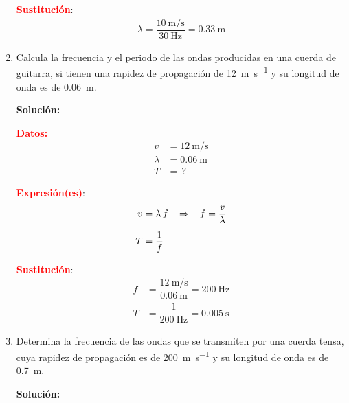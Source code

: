 \documentclass[14pt]{extarticle}
\newcommand{\textocolor}[2]{\textbf{\textcolor{#1}{#2}}}
\begin{document}
\begin{enumerate}
\begin{minipage}{0.5\linewidth}
\noindent
\textocolor{red}{Sustitución}:
\begin{align*}
\lambda = \dfrac{\SI{10}{\meter\per\second}}{\SI{30}{\hertz}} = \SI{0.33}{\meter}
\end{align*}
\end{minipage}
\item Calcula la frecuencia y el periodo de las ondas producidas en una cuerda de guitarra, si tienen una rapidez de propagación de \SI{12}{\meter\per\second} y su longitud de onda es de \SI{0.06}{\meter}.

\textbf{Solución:}

\begin{minipage}[t]{0.35\linewidth}
\noindent
\textocolor{red}{Datos:}
\begin{align*}
v &= \SI{12}{\meter\per\second} \\[0.5em]
\lambda &= \SI{0.06}{\meter} \\[0.5em]
T &= \, ?
\end{align*}
\end{minipage}
\hspace{1cm}
\begin{minipage}[t]{0.35\linewidth}
\noindent
\textocolor{red}{Expresión(es)}:
\begin{align*}
v &= \lambda \, f \hspace{0.3cm} \Rightarrow \hspace{0.3cm} f = \dfrac{v}{\lambda} \\[0.5em]
T &= \dfrac{1}{f}    
\end{align*}
\end{minipage}

\begin{minipage}{0.5\linewidth}
\noindent
\textocolor{red}{Sustitución}:
\begin{align*}
f &= \dfrac{\SI{12}{\meter\per\second}}{\SI{0.06}{\meter}} = \SI{200}{\hertz} \\[0.5em]
T &= \dfrac{1}{\SI{200}{\hertz}} = \SI{0.005}{\second}
\end{align*}
\end{minipage}
\item Determina la frecuencia de las ondas que se transmiten por una cuerda tensa, cuya rapidez de propagación es de \SI{200}{\meter\per\second} y su longitud de onda es de \SI{0.7}{\meter}.

\textbf{Solución:}


\end{enumerate}
\end{document}
